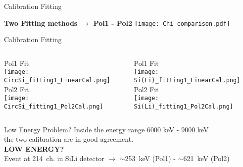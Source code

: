 \documentclass[10pt]{beamer}
\begin{document}
\begin{frame}{Calibration Fitting}
	

	\centering
	\vspace{-0.05\textheight}
	\textbf{Two Fitting methods $\rightarrow$ Pol1 - Pol2}  
	\texttt{[image: Chi\_comparison.pdf]}




\end{frame}

\begin{frame}{Calibration Fitting}
	
	\vspace{-0.2\textheight}
	\begin{columns}
		\begin{column}{0.5\textwidth}
			\begin{overlayarea}{\textwidth}{0.5\textheight}
				\centering
				\vspace{-0.05\textheight}
				\tiny Pol1 Fit\\
				\texttt{[image: CircSi\_fitting1\_LinearCal.png]}\\
				Pol2 Fit\\
				\texttt{[image: CircSi\_fitting1\_Pol2Cal.png]}
			\end{overlayarea}
		\end{column}
		\begin{column}{0.5\textwidth}
			\begin{overlayarea}{\textwidth}{0.5\textheight}
				\centering
				\vspace{-0.05\textheight}
				\tiny Pol1 Fit\\
				\texttt{[image: Si(Li)\_fitting1\_LinearCal.png]}\\
				Pol2 Fit\\
				\texttt{[image: Si(Li)\_fitting1\_Pol2Cal.png]}
			\end{overlayarea}
		\end{column}
	\end{columns}	


\end{frame}


\begin{frame}{Low Energy Problem?}
	\centering
	\vspace{-0.2\textheight}
	Inside the energy range 6000 keV - 9000 keV\\ the two calibration are in good agreement.\\
	\vspace{0.1\textheight}
	\textbf{LOW ENERGY?}\\
	Event at 214~ch. in SiLi detector $\rightarrow$ $\sim$253~keV (Pol1) - $\sim$621~keV (Pol2)

\end{frame}
\end{document}
